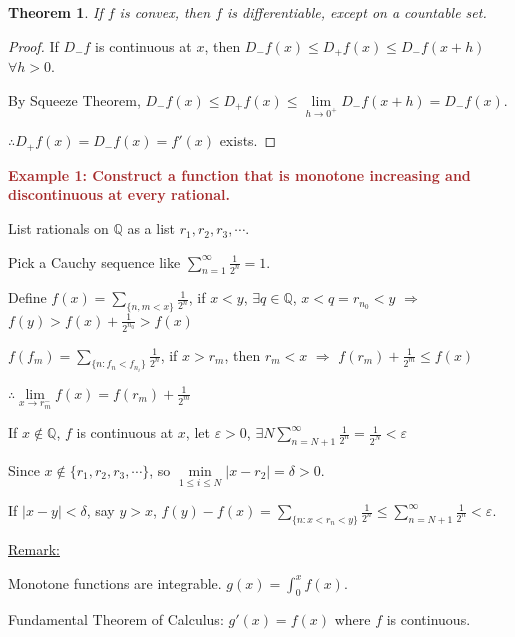 \documentclass[12pt]{article}
\newcommand{\abs}[1]{\left| #1 \right|}
\theoremstyle{plain}
\newtheorem{theorem}{Theorem}[subsection]
\newcommand{\ep}{\varepsilon}
\newcommand{\dlim}{\displaystyle\lim\limits}
\begin{document}
		\vspace{0.1 in}


		\begin{theorem}
			If $f$ is convex, then $f$ is differentiable, except on a countable set.
		\end{theorem}
		\begin{proof}
			If $D_-f$ is continuous at $x$, then $D_-f(x) \leq D_+f(x)\leq D_-f(x+h)$
			$\forall h > 0$. 

			By Squeeze Theorem, $D_-f(x)\leq D_+f(x)
			\leq \dlim_{h\to 0^+} D_-f(x+h) = D_-f(x)$.
			
			$\therefore D_+f(x) = D_-f(x) = f'(x)$ exists.  
		\end{proof}

		\vspace{0.1 in}

		\textcolor{Brown}{
			\textbf{Example 1: Construct a function that is monotone increasing and 
		discontinuous at every rational. }}
		
		List rationals on $\mathbb{Q}$ as a list $ r_1, r_2, r_3, \cdots$. 

		Pick a Cauchy sequence like $\sum^{\infty}_{n=1} \frac1{2^n} = 1$.
		
		Define $f(x) = \sum_{\{n,m<x\}} \frac1{2^n}$, if $x<y$, 
		$\exists q\in\mathbb{Q}$, $x<q=r_{n_0}<y$ $\Rightarrow$ 
		$f(y) > f(x) +\frac1{2^{n_0}}>f(x)$

		$f(f_m)=\sum_{\{n:f_n<f_{n_i}\}} \frac1{2^n}$, if $x>r_m$, then $r_m<x$
		$\Rightarrow$ $f(r_m)+\frac1{2^m}\leq f(x)$

		$\therefore \dlim_{x\to r_m^-}f(x) = f(r_m)+\frac1{2^m}$

		If $x\notin \mathbb{Q}$, $f$ is continuous at $x$, let $\ep>0$, 
		$\exists N \sum_{n=N+1}^{\infty} \frac1{2^n} = \frac1{2^N} < \ep$

		Since $x\notin\{r_1,r_2,r_3, \cdots\}$, so 
		$\underset{1\leq i\leq N}{\min} \abs{x-r_2} = \delta > 0$. 

		If $\abs{x-y}<\delta$, say $y>x$, 
		$f(y)-f(x)= \sum_{\{n:x<r_n<y\}}\frac1{2^n}\leq 
		\sum_{n=N+1}^{\infty}\frac1{2^n} <\ep$. 

		\underline{Remark: }

		Monotone functions are integrable.
		$g(x)=\int_0^x f(x)$. 

		Fundamental Theorem of Calculus: $g'(x) = f(x)$ where $f$ is continuous.\\

		
\end{document}
